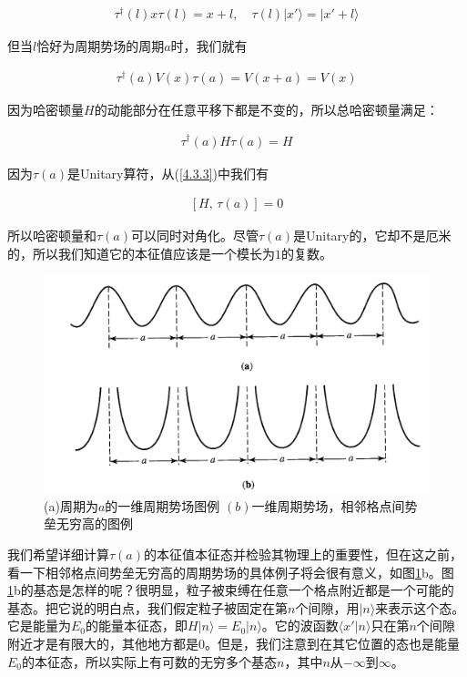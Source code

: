 \documentclass[UTF8,twoside]{ctexart}
\begin{document}
\begin{align}
\tau^{\dagger}(l)x\tau(l) = x+l,\quad \tau(l)|x'\rangle = |x'+l\rangle
\end{align}

但当$l$恰好为周期势场的周期$a$时，我们就有

\begin{align}
\tau^{\dagger}(a)V(x)\tau(a) = V(x+a) = V(x)
\end{align}

\noindent 因为哈密顿量$H$的动能部分在任意平移下都是不变的，所以总哈密顿量满足：

\begin{align} \label{4.3.3}
\tau^{\dagger}(a)H\tau(a) = H
\end{align}

\noindent 因为$\tau(a)$是Unitary算符，从(\ref{4.3.3})中我们有

\begin{align}
\left[H,\, \tau(a)\right] = 0
\end{align}

\noindent 所以哈密顿量和$\tau(a)$可以同时对角化。尽管$\tau(a)$是Unitary的，它却不是厄米的，所以我们知道它的本征值应该是一个模长为$1$的复数。

\begin{figure}[htbp]
\begin{centering}
\includegraphics[width = 12.4cm]{./Sakurai/Fig_4.7.png}
\caption{(a)周期为$a$的一维周期势场图例 $(b)$一维周期势场，相邻格点间势垒无穷高的图例}
\label {Fig4.7}
\end{centering}
\end{figure}

我们希望详细计算$\tau(a)$的本征值本征态并检验其物理上的重要性，但在这之前，看一下相邻格点间势垒无穷高的周期势场的具体例子将会很有意义，如图{\ref{Fig4.7}}b。图{\ref{Fig4.7}}b的基态是怎样的呢？很明显，粒子被束缚在任意一个格点附近都是一个可能的基态。把它说的明白点，我们假定粒子被固定在第$n$个间隙，用$|n\rangle$来表示这个态。它是能量为$E_0$的能量本征态，即$H|n\rangle = E_0|n\rangle$。它的波函数$\langle x'|n\rangle$只在第$n$个间隙附近才是有限大的，其他地方都是$0$。但是，我们注意到在其它位置的态也是能量$E_0$的本征态，所以实际上有可数的无穷多个基态$n$，其中$n$从$-\infty \text{到} \infty$。
\end{document}

